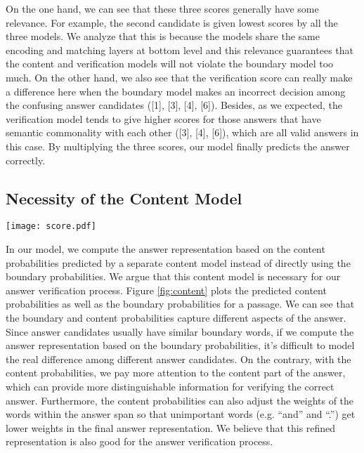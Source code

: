 \documentclass[11pt,a4paper]{article}
\newcommand{\figref}[1]{Figure \ref{#1}}
\begin{document}
On the one hand, we can see that these three scores generally have some relevance. For example, the second candidate is given lowest scores by all the three models. We analyze that this is because the models share the same encoding and matching layers at bottom level and this relevance guarantees that the content and verification models will not violate the boundary model too much. On the other hand, we also see that the verification score can really make a difference here when the boundary model makes an incorrect decision among the confusing answer candidates ([1], [3], [4], [6]). Besides, as we expected, the verification model tends to give higher scores for those answers that have semantic commonality with each other ([3], [4], [6]), which are all valid answers in this case. By multiplying the three scores, our model finally predicts the answer correctly.  

\subsection{Necessity of the Content Model}
\label{necessity}
\begin{figure*}[tb]
\centering
\texttt{[image: score.pdf]}

\caption{The boundary probabilities and content probabilities for the words in a passage}
\label{fig:content}
\end{figure*}



In our model, we compute the answer representation based on the content probabilities predicted by a separate content model instead of directly using the boundary probabilities. 
We argue that this content model is necessary for our answer verification process.  \figref{fig:content} plots the predicted content probabilities as well as the boundary probabilities for a passage. We can see that the boundary and content probabilities capture different aspects of the answer. 
Since answer candidates usually have similar boundary words, if we compute the answer representation based on the boundary probabilities, it's difficult to model the real difference among different answer candidates.
On the contrary, with the content probabilities, we pay more attention to the content part of the answer, which can provide more distinguishable information for verifying the correct answer. Furthermore, the content probabilities can also adjust the weights of the words within the answer span so that unimportant words (e.g. ``and'' and ``.'') get lower weights in the final answer representation. We believe that this refined representation is also good for the answer verification process.
\end{document}

